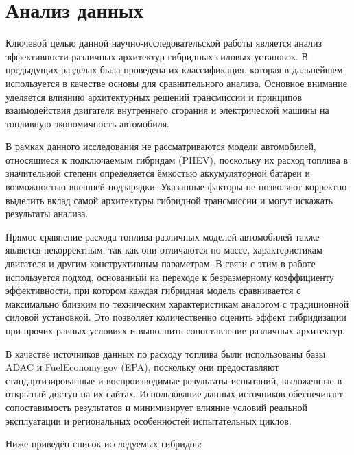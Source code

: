 \chapter{Анализ данных}

Ключевой целью данной научно-исследовательской работы является анализ эффективности различных архитектур гибридных силовых установок. В предыдущих разделах была проведена их классификация, которая в дальнейшем используется в качестве основы для сравнительного анализа. Основное внимание уделяется влиянию архитектурных решений трансмиссии и принципов взаимодействия двигателя внутреннего сгорания и электрической машины на топливную экономичность автомобиля.

В рамках данного исследования не рассматриваются модели автомобилей, относящиеся к подключаемым гибридам (PHEV), поскольку их расход топлива в значительной степени определяется ёмкостью аккумуляторной батареи и возможностью внешней подзарядки. Указанные факторы не позволяют корректно выделить вклад самой архитектуры гибридной трансмиссии и могут искажать результаты анализа.

Прямое сравнение расхода топлива различных моделей автомобилей также является некорректным, так как они отличаются по массе, характеристикам двигателя и другим конструктивным параметрам. В связи с этим в работе используется подход, основанный на переходе к безразмерному коэффициенту эффективности, при котором каждая гибридная модель сравнивается с максимально близким по техническим характеристикам аналогом с традиционной силовой установкой. Это позволяет количественно оценить эффект гибридизации при прочих равных условиях и выполнить сопоставление различных архитектур.

В качестве источников данных по расходу топлива были использованы базы ADAC и FuelEconomy.gov (EPA), поскольку они предоставляют стандартизированные и воспроизводимые результаты испытаний, выложенные в открытый доступ на их сайтах. Использование данных источников обеспечивает сопоставимость результатов и минимизирует влияние условий реальной эксплуатации и региональных особенностей испытательных циклов.

\newpage

Ниже приведён список исследуемых гибридов:

